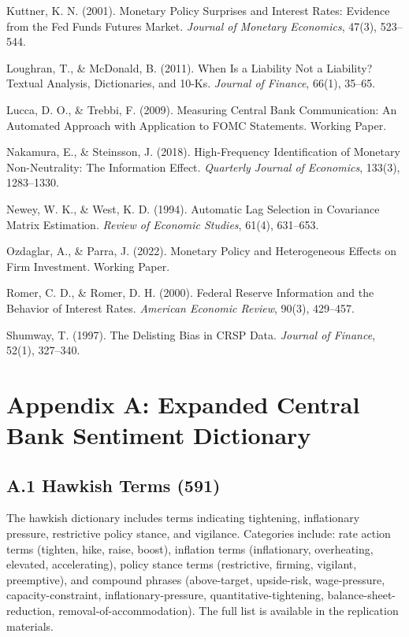\documentclass[12pt]{article}
\begin{document}
Kuttner, K. N. (2001). Monetary Policy Surprises and Interest Rates: Evidence from the Fed Funds Futures Market. \textit{Journal of Monetary Economics}, 47(3), 523–544.

Loughran, T., & McDonald, B. (2011). When Is a Liability Not a Liability? Textual Analysis, Dictionaries, and 10-Ks. \textit{Journal of Finance}, 66(1), 35–65.

Lucca, D. O., & Trebbi, F. (2009). Measuring Central Bank Communication: An Automated Approach with Application to FOMC Statements. Working Paper.

Nakamura, E., & Steinsson, J. (2018). High-Frequency Identification of Monetary Non-Neutrality: The Information Effect. \textit{Quarterly Journal of Economics}, 133(3), 1283–1330.

Newey, W. K., & West, K. D. (1994). Automatic Lag Selection in Covariance Matrix Estimation. \textit{Review of Economic Studies}, 61(4), 631–653.

Ozdaglar, A., & Parra, J. (2022). Monetary Policy and Heterogeneous Effects on Firm Investment. Working Paper.

Romer, C. D., & Romer, D. H. (2000). Federal Reserve Information and the Behavior of Interest Rates. \textit{American Economic Review}, 90(3), 429–457.

Shumway, T. (1997). The Delisting Bias in CRSP Data. \textit{Journal of Finance}, 52(1), 327–340.


\section{Appendix A: Expanded Central Bank Sentiment Dictionary}

\subsection{A.1 Hawkish Terms (591)}

The hawkish dictionary includes terms indicating tightening, inflationary pressure, restrictive policy stance, and vigilance. Categories include: rate action terms (tighten, hike, raise, boost), inflation terms (inflationary, overheating, elevated, accelerating), policy stance terms (restrictive, firming, vigilant, preemptive), and compound phrases (above-target, upside-risk, wage-pressure, capacity-constraint, inflationary-pressure, quantitative-tightening, balance-sheet-reduction, removal-of-accommodation). The full list is available in the replication materials.
\end{document}
